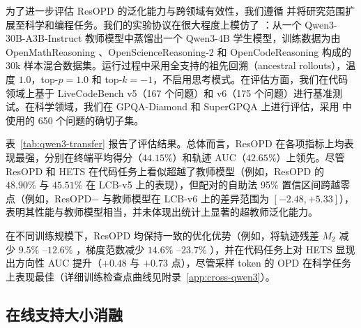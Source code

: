 为了进一步评估 ResOPD 的泛化能力与跨领域有效性，我们遵循 \citet{heo2026policy} 并将研究范围扩展至科学和编程任务。我们的实验协议在很大程度上模仿了 \citet{heo2026policy}：从一个 Qwen3-30B-A3B-Instruct \citep{yang2025qwen3} 教师模型中蒸馏出一个 Qwen3-4B 学生模型，训练数据为由 OpenMathReasoning \citep{moshkov2025aimo}、OpenScienceReasoning-2 \citep{nvidia2025opensciencereasoning2} 和 OpenCodeReasoning \citep{ahmad2025opencodereasoning} 构成的 30k 样本混合数据集。运行过程中采用全支持的祖先回溯（ancestral rollouts），温度 $1.0$，top-$p=1.0$ 和 top-$k=-1$，不启用思考模式。在评估方面，我们在代码领域上基于 LiveCodeBench \citep[LCB;][]{jain2025livecodebench} v5（167 个问题）和 v6（175 个问题）进行基准测试。在科学领域，我们在 GPQA-Diamond \citep[GPQA-D, 198 problems;][]{rein2023gpqa} 和 SuperGPQA \citep{du2026supergpqa} 上进行评估，采用 \citet{heo2026policy} 中使用的 650 个问题的确切子集。

表~\ref{tab:qwen3-transfer} 报告了评估结果。总体而言，ResOPD 在各项指标上均表现最强，分别在终端平均得分（$44.15\%$）和轨迹 AUC（$42.65\%$）上领先。尽管 ResOPD 和 HETS 在代码任务上看似超越了教师模型（例如，ResOPD 的 $48.90\%$ 与 $45.51\%$ 在 LCB-v5 上的表现），但配对的自助法 95\% 置信区间跨越零点（例如，ResOPD$-$ 与教师模型在 LCB-v6 上的差异范围为 $[-2.48, +5.33]$），表明其性能与教师模型相当，并未体现出统计上显著的超教师泛化能力。

在不同训练规模下，ResOPD 均保持一致的优化优势（例如，将轨迹残差 $M_2$ 减少 $9.5\%$ --$12.6\%$ ，梯度范数减少 $14.6\%$ --$23.7\%$ ），并在代码任务上对 HETS 显现出方向性 AUC 提升（$+0.48$ 与 $+0.73$ 点），尽管采样 token 的 OPD 在科学任务上表现最佳（详细训练检查点曲线见附录~\ref{app:cross-qwen3}）。
\vspace{-2mm}

\subsection{在线支持大小消融}
\label{sec:online-support}

